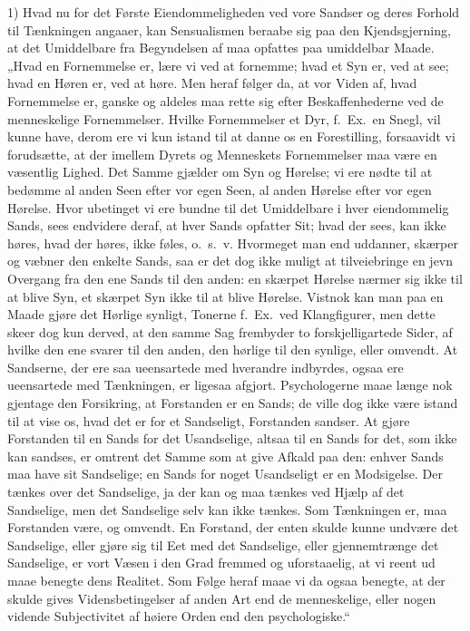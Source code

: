\documentclass[12pt]{book}
\newcommand{\opage}[1]{\marginnote{\footnotesize\textit{[#1]}}}
\begin{document}
\opage{244} 1) Hvad nu for det Første Eiendommeligheden ved vore Sandser og deres Forhold til Tænkningen
angaaer, kan Sensualismen beraabe sig paa den Kjendsgjerning, at det Umiddelbare fra Begyndelsen af
maa opfattes paa umiddelbar Maade. „Hvad en Fornemmelse er, lære vi ved at fornemme; hvad et Syn
er, ved at see; hvad en Høren er, ved at høre. Men heraf følger da, at vor Viden af, hvad
Fornemmelse er, ganske og aldeles maa rette sig efter Beskaffenhederne ved de menneskelige
Fornemmelser. Hvilke Fornemmelser et Dyr, f.\ Ex.\ en Snegl, vil kunne have, derom ere vi kun
istand til at danne os en Forestilling, forsaavidt vi forudsætte, at der imellem Dyrets og
Menneskets Fornemmelser maa være en væsentlig Lighed. Det Samme gjælder om Syn og Hørelse; vi ere
nødte til at bedømme al anden Seen efter vor egen Seen, al anden Hørelse efter vor egen Hørelse.
Hvor ubetinget vi ere bundne til det Umiddelbare i hver eiendommelig Sands, sees endvidere deraf,
at hver Sands opfatter Sit; hvad der sees, kan ikke høres, hvad der høres, ikke føles, o.\ s.\ v.
Hvormeget man end uddanner, skærper og væbner den enkelte Sands, saa er det dog ikke muligt at
tilveiebringe en jevn Overgang fra den ene Sands til den anden: en skærpet Hørelse nærmer sig ikke
til at blive Syn, et skærpet Syn ikke til at blive Hørelse. Vistnok kan man paa en Maade gjøre det
Hørlige synligt, Tonerne f.\ Ex.\ ved Klangfigurer, men dette skeer dog kun derved, at den samme
Sag frembyder to forskjelligartede Sider, af hvilke den ene svarer til den anden, den hørlige til
den synlige, eller omvendt. At Sandserne, der ere saa ueensartede med hverandre indbyrdes, ogsaa
ere ueensartede med Tænkningen, er ligesaa afgjort. Psychologerne maae længe nok gjentage den
Forsikring, at Forstanden er en Sands; de ville dog ikke være istand til at vise os, hvad det er for
et Sandseligt, Forstanden sandser. At gjøre Forstanden til en Sands for det Usandselige, altsaa til
en Sands for det, som ikke kan sandses, er omtrent det
\opage{245} Samme som at give Afkald paa den: enhver Sands maa have sit Sandselige; en Sands for noget
Usandseligt er en Modsigelse. Der tænkes over det Sandselige, ja der kan og maa tænkes ved Hjælp af
det Sandselige, men det Sandselige selv kan ikke tænkes. Som Tænkningen er, maa Forstanden være, og
omvendt. En Forstand, der enten skulde kunne undvære det Sandselige, eller gjøre sig til Eet med det
Sandselige, eller gjennemtrænge det Sandselige, er vort Væsen i den Grad fremmed og uforstaaelig, at
vi reent ud maae benegte dens Realitet. Som Følge heraf maae vi da ogsaa benegte, at der skulde
gives Vidensbetingelser af anden Art end de menneskelige, eller nogen vidende Subjectivitet af
høiere Orden end den psychologiske.“
\end{document}
